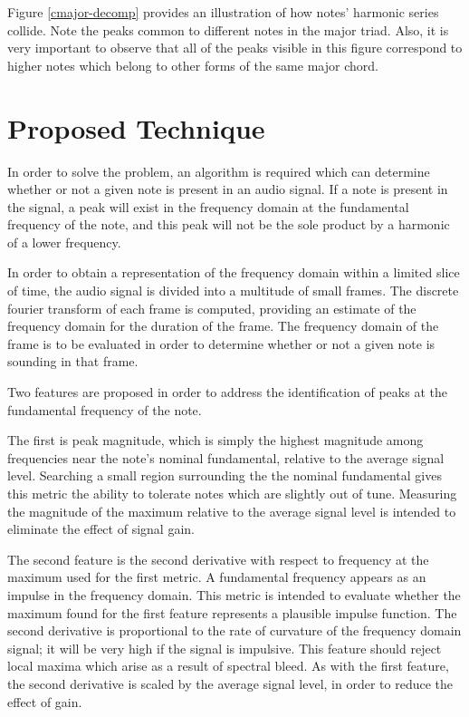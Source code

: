 \documentclass[twocolumn]{article}
\begin{document}
Figure \ref{cmajor-decomp} provides an illustration of how notes' harmonic series collide.  Note the peaks common to different notes in the major triad.  Also, it is very important to observe that all of the peaks visible in this figure correspond to higher notes which belong to other forms of the same major chord.

\section{Proposed Technique}

In order to solve the problem, an algorithm is required which can determine whether or not a given note is present in an audio signal.  If a note is present in the signal, a peak will exist in the frequency domain at the fundamental frequency of the note, and this peak will not be the sole product by a harmonic of a lower frequency.

In order to obtain a representation of the frequency domain within a limited slice of time, the audio signal is divided into a multitude of small frames.  The discrete fourier transform of each frame is computed, providing an estimate of the frequency domain for the duration of the frame.  The frequency domain of the frame is to be evaluated in order to determine whether or not a given note is sounding in that frame.

Two features are proposed in order to address the identification of peaks at the fundamental frequency of the note.

The first is peak magnitude, which is simply the highest magnitude among frequencies near the note's nominal fundamental, relative to the average signal level.  Searching a small region surrounding the the nominal fundamental gives this metric the ability to tolerate notes which are slightly out of tune.  Measuring the magnitude of the maximum relative to the average signal level is intended to eliminate the effect of signal gain.

The second feature is the second derivative with respect to frequency at the maximum used for the first metric.  A fundamental frequency appears as an impulse in the frequency domain. This metric is intended to evaluate whether the maximum found for the first feature represents a plausible impulse function.  The second derivative is proportional to the rate of curvature of the frequency domain signal; it will be very high if the signal is impulsive.  This feature should reject local maxima which arise as a result of spectral bleed.  As with the first feature, the second derivative is scaled by the average signal level, in order to reduce the effect of gain.
\end{document}
